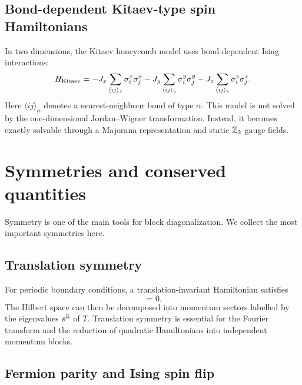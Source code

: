 \subsection{Bond-dependent Kitaev-type spin Hamiltonians}

In two dimensions, the Kitaev honeycomb model uses bond-dependent Ising
interactions:
\begin{equation}
\label{eq:kitaev-honeycomb-convention}
    H_{\rm Kitaev}
    =
    -J_x\sum_{\langle ij\rangle_x}\sigma_i^x\sigma_j^x
    -J_y\sum_{\langle ij\rangle_y}\sigma_i^y\sigma_j^y
    -J_z\sum_{\langle ij\rangle_z}\sigma_i^z\sigma_j^z.
\end{equation}
Here $\langle ij\rangle_\alpha$ denotes a nearest-neighbour bond of type $\alpha$.
This model is not solved by the one-dimensional Jordan--Wigner transformation.
Instead, it becomes exactly solvable through a Majorana representation and static
$\mathbb{Z}_2$ gauge fields.

\section{Symmetries and conserved quantities}

Symmetry is one of the main tools for block diagonalization. We collect the most
important symmetries here.

\subsection{Translation symmetry}

For periodic boundary conditions, a translation-invariant Hamiltonian satisfies
\begin{equation}
    [H,T]=0.
\end{equation}
The Hilbert space can then be decomposed into momentum sectors labelled by the
eigenvalues $\ee^{\ii k}$ of $T$. Translation symmetry is essential for the Fourier
transform and the reduction of quadratic Hamiltonians into independent momentum
blocks.

\subsection{Fermion parity and Ising spin flip}

